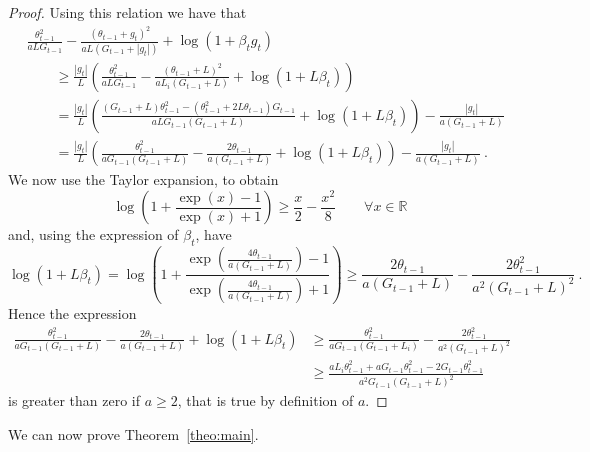 \documentclass{article}
\newcommand{\field}[1]{\mathbb{#1}}
\newcommand{\R}{\field{R}}
\begin{document}
\begin{proof}
Using this relation we have that
\begin{align*}
&\frac{\theta_{t-1}^2}{a L G_{t-1}}-\frac{(\theta_{t-1}+g_t)^2}{a L (G_{t-1}+|g_t|)} +\log(1+\beta_t g_t)\\
&\qquad \geq \frac{|g_t|}{L} \left(\frac{\theta_{t-1}^2}{a L G_{t-1}} - \frac{(\theta_{t-1}+L)^2}{a L_i (G_{t-1} + L)} + \log(1+L \beta_t)\right)\\
&\qquad = \frac{|g_t|}{L} \left(\frac{(G_{t-1} + L) \theta_{t-1}^2 - (\theta_{t-1}^2+2 L \theta_{t-1} )G_{t-1} }{a L G_{t-1}(G_{t-1} + L)} + \log(1+L \beta_t)\right) - \frac{|g_t|}{a (G_{t-1} + L)}\\
&\qquad = \frac{|g_t|}{L} \left(\frac{\theta_{t-1}^2}{a G_{t-1}(G_{t-1} + L)}-\frac{2 \theta_{t-1}}{a (G_{t-1} + L)} + \log(1+L \beta_t)\right) - \frac{|g_t|}{a (G_{t-1} + L)}~.
\end{align*}
We now use the Taylor expansion, to obtain
\[
\log\left(1+\frac{\exp(x)-1}{\exp(x)+1}\right) \geq \frac{x}{2} -\frac{x^2}{8} \qquad \forall x \in \R
\]
and, using the expression of $\beta_t$, have
\[
\log\left(1+L \beta_t\right) 
= \log\left(1+\frac{\exp\left(\frac{4 \theta_{t-1}}{a (G_{t-1} + L)}\right)-1}{\exp\left(\frac{4 \theta_{t-1}}{a (G_{t-1} + L)}\right)+1}\right) 
\geq \frac{2 \theta_{t-1}}{a (G_{t-1} + L)} -\frac{2 \theta_{t-1}^2}{a^2 (G_{t-1} + L)^2}~.
\]
Hence the expression 
\begin{align*}
\frac{\theta_{t-1}^2}{a G_{t-1}(G_{t-1} + L)}-\frac{2 \theta_{t-1}}{a (G_{t-1} + L)} + \log(1 + L \beta_t)
&\geq \frac{\theta_{t-1}^2}{a G_{t-1}(G_{t-1} + L_i)}-\frac{2 \theta_{t-1}^2}{a^2 (G_{t-1} + L)^2}\\
& \geq \frac{a L_i \theta_{t-1}^2 + a G_{t-1} \theta_{t-1}^2  - 2 G_{t-1} \theta_{t-1}^2}{a^2 G_{t-1}(G_{t-1} + L)^2}
\end{align*}
is greater than zero if $a \geq 2$, that is true by definition of $a$.
\end{proof}

We can now prove Theorem~\ref{theo:main}.
\end{document}
